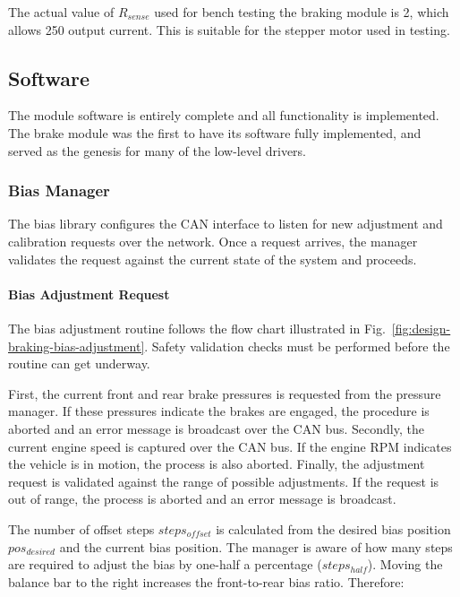 The actual value of $R_{sense}$ used for bench testing the braking module is \unit{2}{\ohm}, which allows \unit{250}{\milli\ampere} output current. This is suitable for the stepper motor used in testing.

\subsection{Software}

The module software is entirely complete and all functionality is implemented. The brake module was the first to have its software fully implemented, and served as the genesis for many of the low-level drivers.

\subsubsection{Bias Manager}

The bias library configures the CAN interface to listen for new adjustment and calibration requests over the network. Once a request arrives, the manager validates the request against the current state of the system and proceeds. 

\paragraph{Bias Adjustment Request}
\label{sec:impl_braking_bar}

The bias adjustment routine follows the flow chart illustrated in Fig.\ \ref{fig:design-braking-bias-adjustment}. Safety validation checks must be performed before the routine can get underway. 

First, the current front and rear brake pressures is requested from the pressure manager. If these pressures indicate the brakes are engaged, the procedure is aborted and an error message is broadcast over the CAN bus. Secondly, the current engine speed is captured over the CAN bus. If the engine RPM indicates the vehicle is in motion, the process is also aborted. Finally, the adjustment request is validated against the range of possible adjustments. If the request is out of range, the process is aborted and an error message is broadcast.

The number of offset steps $steps_{offset}$ is calculated from the desired bias position $pos_{desired}$ and the current bias position. The manager is aware of how many steps are required to adjust the bias by one-half a percentage ($steps_{half}$). Moving the balance bar to the right increases the front-to-rear bias ratio. Therefore:

